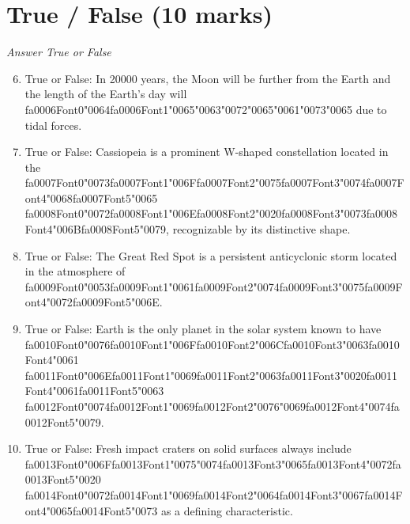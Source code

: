 \documentclass[12pt]{article}
\begin{document}
\section*{True / False (10 marks)}
\textit{Answer True or False}
\begin{enumerate}[label=\arabic*.]
\setcounter{enumi}{5}
\item True or False: In 20000 years, the Moon will be further from the Earth and the length of the Earth's day will {\csname fa0006Font0\endcsname\char"0064}{\csname fa0006Font1\endcsname\char"0065}{\char"0063}{\char"0072}{\char"0065}{\char"0061}{\char"0073}{\char"0065} due to tidal forces.
\item True or False: Cassiopeia is a prominent W-shaped constellation located in the {\csname fa0007Font0\endcsname\char"0073}{\csname fa0007Font1\endcsname\char"006F}{\csname fa0007Font2\endcsname\char"0075}{\csname fa0007Font3\endcsname\char"0074}{\csname fa0007Font4\endcsname\char"0068}{\csname fa0007Font5\endcsname\char"0065} {\csname fa0008Font0\endcsname\char"0072}{\csname fa0008Font1\endcsname\char"006E}{\csname fa0008Font2\endcsname\char"0020}{\csname fa0008Font3\endcsname\char"0073}{\csname fa0008Font4\endcsname\char"006B}{\csname fa0008Font5\endcsname\char"0079}, recognizable by its distinctive shape.
\item True or False: The Great Red Spot is a persistent anticyclonic storm located in the atmosphere of {\csname fa0009Font0\endcsname\char"0053}{\csname fa0009Font1\endcsname\char"0061}{\csname fa0009Font2\endcsname\char"0074}{\csname fa0009Font3\endcsname\char"0075}{\csname fa0009Font4\endcsname\char"0072}{\csname fa0009Font5\endcsname\char"006E}.
\item True or False: Earth is the only planet in the solar system known to have {\csname fa0010Font0\endcsname\char"0076}{\csname fa0010Font1\endcsname\char"006F}{\csname fa0010Font2\endcsname\char"006C}{\csname fa0010Font3\endcsname\char"0063}{\csname fa0010Font4\endcsname\char"0061} {\csname fa0011Font0\endcsname\char"006E}{\csname fa0011Font1\endcsname\char"0069}{\csname fa0011Font2\endcsname\char"0063}{\csname fa0011Font3\endcsname\char"0020}{\csname fa0011Font4\endcsname\char"0061}{\csname fa0011Font5\endcsname\char"0063} {\csname fa0012Font0\endcsname\char"0074}{\csname fa0012Font1\endcsname\char"0069}{\csname fa0012Font2\endcsname\char"0076}{\char"0069}{\csname fa0012Font4\endcsname\char"0074}{\csname fa0012Font5\endcsname\char"0079}.
\item True or False: Fresh impact craters on solid surfaces always include {\csname fa0013Font0\endcsname\char"006F}{\csname fa0013Font1\endcsname\char"0075}{\char"0074}{\csname fa0013Font3\endcsname\char"0065}{\csname fa0013Font4\endcsname\char"0072}{\csname fa0013Font5\endcsname\char"0020} {\csname fa0014Font0\endcsname\char"0072}{\csname fa0014Font1\endcsname\char"0069}{\csname fa0014Font2\endcsname\char"0064}{\csname fa0014Font3\endcsname\char"0067}{\csname fa0014Font4\endcsname\char"0065}{\csname fa0014Font5\endcsname\char"0073} as a defining characteristic.
\end{enumerate}
\end{document}
